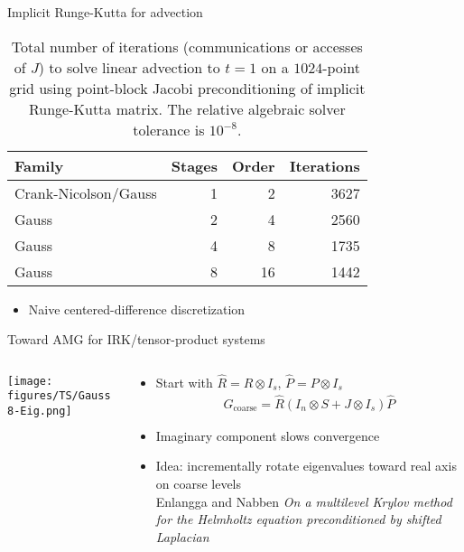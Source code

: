 \documentclass{beamer}
\begin{document}
\begin{frame}{Implicit Runge-Kutta for advection}
  \begin{table}
    \centering
    \caption{Total number of iterations (communications or accesses of $J$) to solve linear advection to $t=1$ on a $1024$-point grid using point-block Jacobi preconditioning of implicit Runge-Kutta matrix.
      The relative algebraic solver tolerance is $10^{-8}$.}\label{tab:irk-advection}
    \begin{tabular}{lrrr}
      \toprule
      Family & Stages & Order & Iterations \\
      \midrule
      Crank-Nicolson/Gauss & 1 & 2 & 3627 \\
      Gauss & 2 & 4 & 2560 \\
      Gauss & 4 & 8 & 1735 \\
      Gauss & 8 & 16 & 1442 \\
      \bottomrule
    \end{tabular}
  \end{table}
  \begin{itemize}
  \item Naive centered-difference discretization
  \end{itemize}
\end{frame}

\begin{frame}{Toward AMG for IRK/tensor-product systems}
  \begin{columns}
    \begin{column}{0.3\textwidth}
      \texttt{[image: figures/TS/Gauss8-Eig.png]}
    \end{column}
    \begin{column}{0.7\textwidth}
      \begin{itemize}
      \item Start with $\hat R = R \otimes I_s$, $\hat P = P \otimes I_s$
        \begin{gather*}
          G_{\text{coarse}} = \hat R (I_n \otimes S + J \otimes I_s) \hat P
        \end{gather*}
      \item Imaginary component slows convergence
      \item Idea: incrementally rotate eigenvalues toward real axis on coarse levels \\
        Enlangga and Nabben \emph{On a multilevel Krylov method for the Helmholtz equation preconditioned by shifted Laplacian}
      \end{itemize}
    \end{column}
  \end{columns}
\end{frame}
\end{document}
